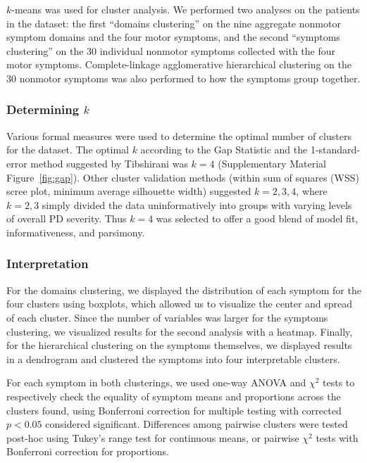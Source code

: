 \documentclass[preprint,5p]{elsarticle} %
\begin{document}
$k$-means was used for cluster analysis. We performed two analyses on the
patients in the dataset: the first ``domains clustering'' on the nine aggregate nonmotor symptom
domains and the four motor symptoms, and the second ``symptoms clustering'' on the 30 individual
nonmotor symptoms collected with the four motor symptoms. Complete-linkage agglomerative
hierarchical clustering on the 30 nonmotor symptoms was also performed to how the symptoms group
together.

\subsubsection{Determining $k$}

Various formal measures were used to determine the optimal number of clusters for the dataset. The
optimal $k$ according to the Gap Statistic and the 1-standard-error method suggested by
Tibshirani\cite{tibshirani01gap} was $k = 4$ (Supplementary Material Figure~\ref{fig:gap}). Other cluster validation
methods (within sum of squares (WSS) scree plot, minimum average silhouette width) suggested $k =
2, 3, 4$, where $k = 2, 3$ simply divided the data uninformatively into groups with varying levels
of overall PD severity. Thus $k = 4$ was selected to offer a good blend of model fit,
informativeness, and parsimony.

\subsubsection{Interpretation}

For the domains clustering, we displayed the distribution of each symptom for the four
clusters using boxplots, which allowed us to visualize the center and spread of each cluster. Since
the number of variables was larger for the symptoms clustering, we visualized results for the
second analysis with a heatmap. Finally, for the hierarchical clustering on the symptoms
themselves, we displayed results in a dendrogram and clustered the symptoms into four interpretable
clusters.

For each symptom in both clusterings, we used one-way ANOVA and $\chi^2$ tests to respectively
check the equality of symptom means and proportions across the clusters found, using Bonferroni
correction for multiple testing with corrected $p < 0.05$ considered significant. Differences among
pairwise clusters were tested post-hoc using Tukey's range test for continuous means, or pairwise
$\chi^2$ tests with Bonferroni correction for proportions.
\end{document}
